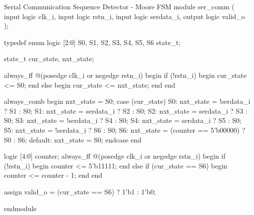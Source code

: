 \documentclass[../main.tex]{subfiles}
\begin{document}
\begin{svminted}{Serial Communication Sequence Detector - Moore FSM}
module ser_comm (
    input   logic clk_i,
    input   logic rstn_i,
    input   logic serdata_i,
    output  logic valid_o
  );

  typedef enum logic [2:0] {S0, S1, S2, S3, S4, S5, S6} state_t;

  state_t cur_state, nxt_state;

  always_ff @(posedge clk_i or negedge rstn_i) begin
    if (!rstn_i) begin
      cur_state <= S0;
    end else begin
      cur_state <= nxt_state;
    end
  end

  always_comb begin
    nxt_state = S0;
    case (cur_state)
      S0: nxt_state = !serdata_i ? S1 : S0;
      S1: nxt_state =  serdata_i ? S2 : S0;
      S2: nxt_state =  serdata_i ? S3 : S0;
      S3: nxt_state = !serdata_i ? S4 : S0;
      S4: nxt_state =  serdata_i ? S5 : S0;
      S5: nxt_state = !serdata_i ? S6 : S0;
      S6: nxt_state = (counter == 5'b00000) ? S0 : S6;
      default: nxt_state = S0;
    endcase
  end

  logic [4:0] counter;
  always_ff @(posedge clk_i or negedge rstn_i) begin
    if (!rstn_i) begin
      counter <= 5'b11111;
    end else if (cur_state == S6) begin
      counter <= counter - 1;
    end
  end

  assign valid_o = (cur_state == S6) ? 1'b1 : 1'b0;

endmodule
\end{svminted}
\end{document}

